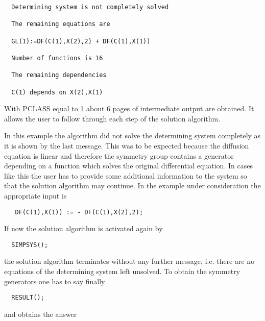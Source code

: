 \begin{verbatim}
  Determining system is not completely solved

  The remaining equations are

  GL(1):=DF(C(1),X(2),2) + DF(C(1),X(1))

  Number of functions is 16

  The remaining dependencies

  C(1) depends on X(2),X(1)
\end{verbatim}

With PCLASS equal to 1 about 6 pages of intermediate output are
obtained. It allows the user to follow through each step of the
solution algorithm.

In this example the algorithm did not solve the determining system
completely as it is shown by the last message. This was to be expected
because the diffusion equation is linear and therefore the symmetry
group contains a generator depending on a function which solves the
original differential equation. In cases like this the user has to
provide some additional information to the system so that the solution
algorithm may continue. In the example under consideration the
appropriate input is

\begin{verbatim}
   DF(C(1),X(1)) := - DF(C(1),X(2),2);
\end{verbatim}

If now the solution algorithm is activated again by

\begin{verbatim}
  SIMPSYS();
\end{verbatim}

the solution algorithm terminates without any further message, i.e.
there are no equations of the determining system left unsolved. To
obtain the symmetry generators one has to say finally

\begin{verbatim}
  RESULT();
\end{verbatim}

and obtains the answer

